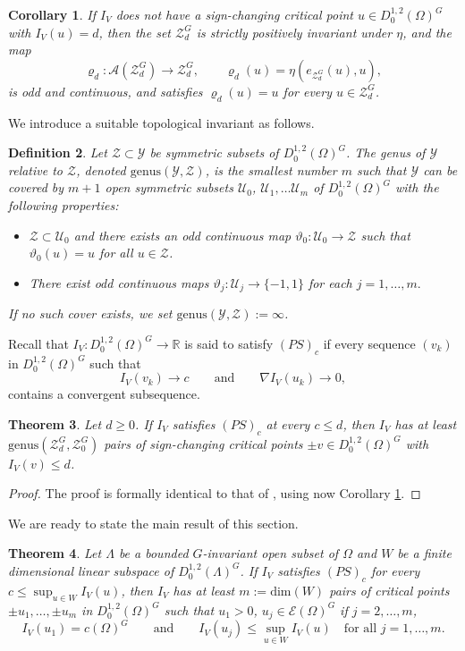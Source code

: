\documentclass[10pt,letterpaper]{article}
\newtheorem{theorem}{Theorem}[section]
\newtheorem{corollary}[theorem]{Corollary}
\newtheorem{definition}[theorem]{Definition}
\numberwithin{equation}{section}
\def\r{\mathbb{R}}
\def\o{\Omega}
\def\cA{\mathcal{A}}
\def\cE{\mathcal{E}}
\def\cU{\mathcal{U}}
\def\cY{\mathcal{Y}}
\def\cZ{\mathcal{Z}}
\def\dim{\mathrm{dim}}
\def\gen{\mathrm{genus}}
\begin{document}
\begin{corollary} \label{cor:retraction}
If $I_V$ does not have a sign-changing critical point $u \in D^{1,2}_0(\o)^G$ with $I_V(u)=d$, then the set $\cZ_d^G$ is strictly positively invariant under $\eta$, and the map
$$\varrho_d:\cA(\cZ_d^G)\to\cZ_d^G, \qquad \varrho_d(u)= \eta(e_{\cZ_d^G} (u),u),$$
is odd and continuous, and satisfies $\varrho_d(u)=u$ for every $u\in\cZ_d^G$.
\end{corollary}

We introduce a suitable topological invariant as follows.

\begin{definition}\label{def:genus}
Let $\cZ\subset\cY$ be symmetric subsets of $D^{1,2}_0(\o)^G$. The \emph{genus of $\cY$ relative to $\cZ$}, denoted $\gen(\cY,\cZ)$, is the smallest number $m$ such that $\cY$ can be covered by $m+1$ open symmetric subsets $\cU_0$, $\cU_1, \ldots \cU_m$ of $D^{1,2}_0(\o)^G$ with the following properties:
\begin{itemize}
\item [$(i)$] $\cZ\subset\cU_0$ and there exists an odd continuous map $\vartheta_0 : \cU_0\to\cZ$ such that $\vartheta_0(u)=u$ for all $u\in\cZ$.
\item [$(ii)$] There exist odd continuous maps $\vartheta_j: \cU_j \to\{-1,1\}$ for each $j=1,\ldots,m.$
\end{itemize}
If no such cover exists, we set $\gen(\cY,\cZ):=\infty$.
\end{definition}

Recall that $I_V:D^{1,2}_0(\o)^G\to\r$ is said to satisfy $(PS)_c$ if every sequence $(v_k)$ in $D^{1,2}_0(\o)^G$ such that
$$I_V(v_k)\to c\qquad\text{and}\qquad \nabla I_V(u_k)\to 0,$$
contains a convergent subsequence.

\begin{theorem} \label{thm:genus}
Let $d\geq 0$. If $I_V$ satisfies $(PS)_c$ at every $c\leq d$, then $I_V$ has at least $\gen(\cZ_d^G,\cZ_0^G)$ pairs of sign-changing critical points $\pm v\in D^{1,2}_0(\o)^G$ with $I_V(v)\leq d$.
\end{theorem}

\begin{proof}
The proof is formally identical to that of \cite[Proposition 3.6]{cp}, using now Corollary \ref{cor:retraction}.
\end{proof}

We are ready to state the main result of this section.

\begin{theorem} \label{thm:nodal principle}
Let $\Lambda$ be a bounded $G$-invariant open subset of $\o$ and $W$ be a finite dimensional linear subspace of $D^{1,2}_0(\Lambda)^G$. If $I_V$ satisfies $(PS)_c$ for every $c\leq \sup_{u\in W}I_V(u)$, then $I_V$ has at least $m:=\dim(W)$ pairs of critical points $\pm u_1,\ldots,\pm u_m$ in $D^{1,2}_0(\o)^G$ such that $u_1>0$, $u_j\in\cE(\o)^G$ if $j=2,\ldots,m$, 
$$I_V(u_1)=c(\o)^G\qquad\text{and}\qquad I_V(u_j)\leq \sup_{u\in W}I_V(u)\quad\text{for all \ }j=1,\ldots,m.$$
\end{theorem}
\end{document}
